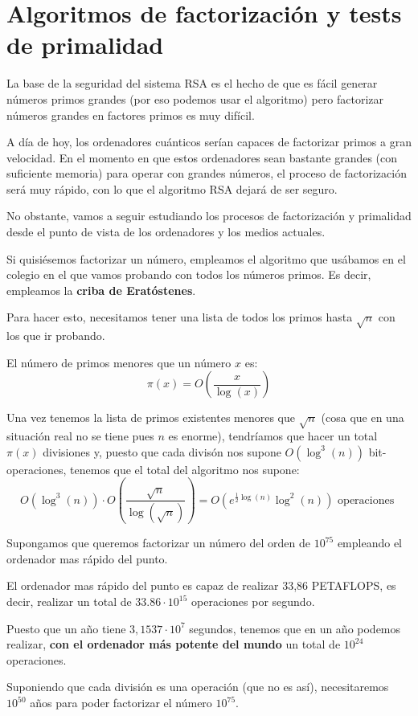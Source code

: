 \chapter{Algoritmos de factorización y tests de primalidad}

La base de la seguridad del sistema RSA es el hecho de que es fácil generar números primos grandes (por eso podemos usar el algoritmo) pero factorizar números grandes en factores primos es muy difícil.

A día de hoy, los ordenadores cuánticos serían capaces de factorizar primos a gran velocidad. En el momento en que estos ordenadores sean bastante grandes (con suficiente memoria) para operar con grandes números, el proceso de factorización será muy rápido, con lo que el algoritmo RSA dejará de ser seguro.

No obstante, vamos a seguir estudiando los procesos de factorización y primalidad desde el punto de vista de los ordenadores y los medios actuales.

Si quisiésemos factorizar un número, empleamos el algoritmo que usábamos en el colegio en el que vamos probando con todos los números primos. Es decir, empleamos la \textbf{criba de Eratóstenes}.

Para hacer esto, necesitamos tener una lista de todos los primos hasta $\sqrt{n}$ con los que ir probando.

\begin{theorem}
El número de primos menores que un número $x$ es:
\[π(x) = O\left( \frac{x}{\log(x)}\right)\]
\end{theorem}

Una vez tenemos la lista de primos existentes menores que $\sqrt{n}$ (cosa que en una situación real no se tiene pues $n$ es enorme), tendríamos que hacer un total $π(x)$ divisiones y, puesto que cada divisón nos supone $O(\log^3(n))$ bit-operaciones, tenemos que el total del algoritmo nos supone:
\[O(\log^3(n))\cdot O\left(\frac{\sqrt{n}}{\log(\sqrt{n})}\right) = O\left( e^{\frac{1}{2}\log(n)}\log^2(n)\right) \text{ operaciones }\]

\begin{example}
Supongamos que queremos factorizar un número del orden de $10^{75}$ empleando el ordenador mas rápido del punto.

El ordenador mas rápido del punto es capaz de realizar 33,86 PETAFLOPS, es decir, realizar un total de $33.86 \cdot 10^{15}$ operaciones por segundo.

Puesto que un año tiene $3,1537 \cdot 10^{7}$ segundos, tenemos que en un año podemos realizar, \textbf{con el ordenador más potente del mundo} un total de $10^{24}$ operaciones.

Suponiendo que cada división es una operación (que no es así), necesitaremos $10^{50}$ años para poder factorizar el número $10^{75}$.
\end{example}

